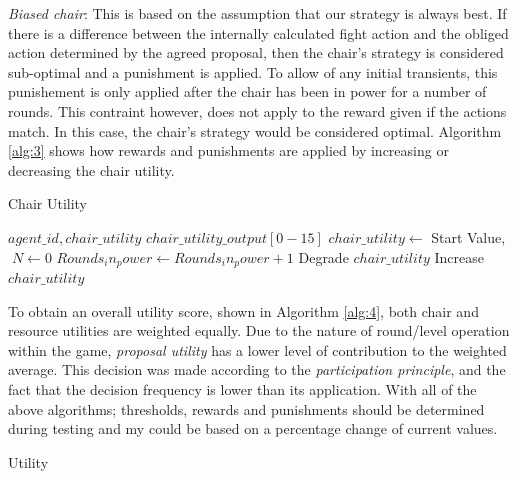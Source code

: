 \textit{Biased chair}: This is based on the assumption that our strategy is always best. If there is a difference between the internally calculated fight action and the obliged action determined by the agreed proposal, then the chair's strategy is considered sub-optimal and a punishment is applied. To allow of any initial transients, this punishement is only applied after the chair has been in power for a number of rounds. This contraint however, does not apply to the reward given if the actions match. In this case, the chair's strategy would be considered optimal. Algorithm \ref{alg:3} shows how rewards and punishments are applied by increasing or decreasing the chair utility. 

\begin{algorithm}
\caption{Chair Utility}\label{alg:3}
\begin{algorithmic} 
\scriptsize
\Require $agent\_id, chair\_utility$
\Ensure $chair\_utility\_output[0-15]$
\State $chair\_utility \leftarrow$ Start Value, $\; N \leftarrow 0$
\EndIf
{}
\State $Rounds_in_power \leftarrow Rounds_in_power+1$
\State Degrade $chair\_utility$
\EndIf
\EndIf
{}
\State Increase $chair\_utility$
\EndIf
\end{algorithmic}
\end{algorithm}

To obtain an overall utility score, shown in Algorithm \ref{alg:4}, both chair and resource utilities are weighted equally. Due to the nature of round/level operation within the game, \textit{proposal utility} has a lower level of contribution to the weighted average. This decision was made according to the \textit{participation principle}, and the fact that the decision frequency is lower than its application. With all of the above algorithms; thresholds, rewards and punishments should be determined during testing and my could be based on a percentage change of current values.                     


\begin{algorithm}
\caption{Utility}\label{alg:4}
\begin{algorithmic} 
\scriptsize
\Require $agent\_id, chair\_utility, resource\_utility, proposal\_utility$
\Ensure $utility\_score[0-15]$
\State $total\_utility \leftarrow average\{chair\_utility \times w_1, resource\_utility \times w_1, proposal\_utility \times w_2}$
\EndIf
\end{algorithmic}
\end{algorithm}


